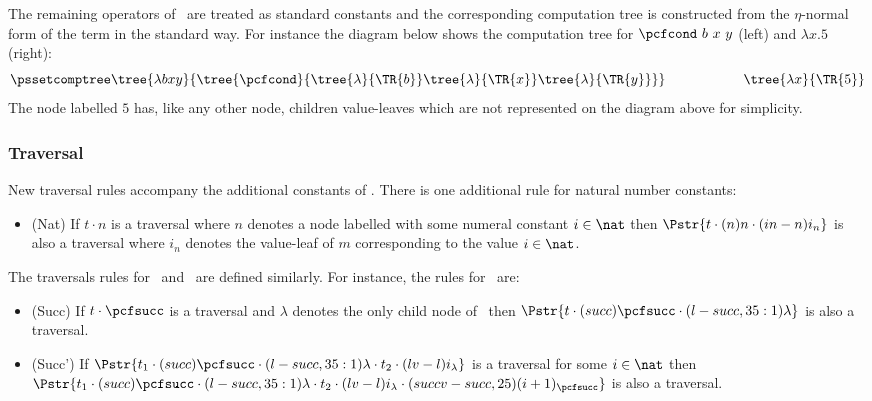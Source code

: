 The remaining operators of \ialgol\ are treated as standard
constants and the corresponding computation tree is constructed from
the $\eta$-normal form of the term in the standard way. For instance
the diagram below shows the computation tree for $\pcfcond\ b\ x\ y$
(left) and $\lambda x . 5$ (right):
$$
\pssetcomptree\tree{\lambda b x y}
     {  \tree{\pcfcond}
        {   \tree{\lambda} {\TR{b}}
            \tree{\lambda} {\TR{x}}
            \tree{\lambda} {\TR{y}}
        }
    }
\hspace{2cm} \tree{\lambda x}{  \TR{5} }
$$
The node labelled $5$ has, like any other node, children
value-leaves which are not represented on the diagram above for
simplicity.

\subsubsection{Traversal}

New traversal rules accompany the additional constants of \ialgol.
There is one additional rule for natural number constants:
\begin{itemize}
\item (Nat) If $t \cdot n$ is a traversal where $n$ denotes a node labelled with some numeral constant $i\in \nat$ then
            $\Pstr{t \cdot (n){n} \cdot (in-n){i_n}}$
            is also a traversal where $i_n$ denotes the value-leaf of $m$ corresponding to the value $i\in \nat$.
\end{itemize}

\noindent The traversals rules for \pcfpred\ and \pcfsucc\ are
defined similarly. For instance, the rules for \pcfsucc\ are:
\begin{itemize}
\item (Succ) If $t \cdot \pcfsucc$ is a traversal and $\lambda$ denotes the only child node of \pcfsucc\ then
$\Pstr{t \cdot (succ){\pcfsucc} \cdot (l-succ,35:1){\lambda}}$ is also a traversal.

\item (Succ') If
$\Pstr{ t_1 \cdot (succ){\pcfsucc} \cdot (l-succ,35:1){\lambda} \cdot t_2
\cdot (lv-l){i_{\lambda}}} $ is a traversal for some
$i \in \nat$ then $\Pstr{t_1 \cdot (succ){\pcfsucc} \cdot
(l-succ,35:1){\lambda} \cdot t_2 \cdot (lv-l){i_{\lambda}} \cdot
(succv-succ,25){(i+1)_{\pcfsucc}}}$ is also a traversal.
\end{itemize}

